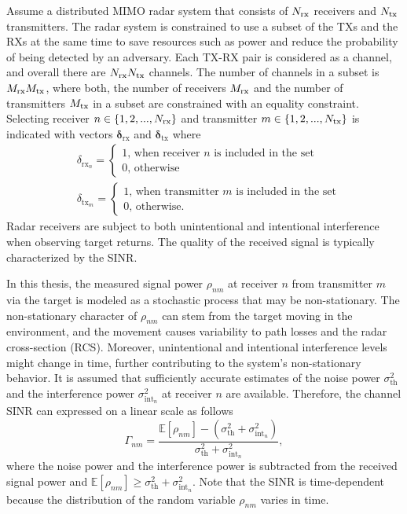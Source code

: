 \documentclass[english, 12pt, a4paper, elec, utf8, a-1b, online]{aaltothesis}
\numberwithin{equation}{section}
\newcommand{\E}[1]{\mathbb{E}\left[ #1 \right]}
\newcommand{\thnoise}{\sigma^2_{\text{th}}}
\newcommand{\eintnoise}{\sigma^2_{\text{int}_{n}}}
\newcommand{\esinrexp}{\Gamma_{nm}}
\newcommand{\easvtx}{\delta_{\text{tx}_m}}
\newcommand{\vasvtx}{\boldsymbol{\delta}_{\text{tx}}}
\newcommand{\easvrx}{\delta_{\text{rx}_n}}
\newcommand{\vasvrx}{\boldsymbol{\delta}_{\text{rx}}}
\newcommand{\esp}{\rho_{nm}}
\begin{document}
Assume a distributed MIMO radar system that consists of ${N_{\text{rx}}}$ receivers and ${N_{\text{tx}}}$ transmitters.
The radar system is constrained to use a subset of the TXs and the RXs at the same time to save resources such as power and reduce the probability of being detected by an adversary.
Each TX-RX pair is considered as a channel, and overall there are ${N_{\text{rx}}}{N_{\text{tx}}}$ channels.
The number of channels in a subset is ${M_{\text{rx}}} {M_{\text{tx}}}$, where both, the number of receivers ${M_{\text{rx}}}$ and the number of transmitters ${M_{\text{tx}}}$ in a subset are constrained with an equality constraint.
Selecting receiver $n \in \{1, 2, ..., {N_{\text{rx}}}\}$ and transmitter $m \in \{1,2, ..., {N_{\text{tx}}}\}$ is indicated with vectors $\vasvrx$ and $\vasvtx$ where
\begin{align}
    &\easvrx = 
    \left\{\begin{array}{l}
        1 \text{, when receiver $n$ is included in the set} \\
        0 \text{, otherwise}
    \end{array}\right.\\
    &\easvtx = 
    \left\{\begin{array}{l}
        1 \text{, when transmitter $m$ is included in the set} \\
        0 \text{, otherwise.}
    \end{array}\right.
\end{align}
Radar receivers are subject to both unintentional and intentional interference when observing target returns.
The quality of the received signal is typically characterized by the SINR.

In this thesis, the measured signal power $\esp$ at receiver $n$ from transmitter $m$ via the target is modeled as a stochastic process that may be non-stationary. 
The non-stationary character of $\esp$ can stem from the target moving in the environment, and 
the movement causes variability to path losses and the radar cross-section (RCS).
Moreover, unintentional and intentional interference levels might change in time, further contributing to the system's non-stationary behavior.
It is assumed that sufficiently accurate estimates of the noise power $\thnoise$ and the interference power $\eintnoise$ at receiver $n$ are available.
Therefore, the channel SINR can expressed on a linear scale as follows
\begin{equation}\label{eq:sinr}
     \esinrexp = \frac{\E{\esp} - (\thnoise + \eintnoise)}{\thnoise + \eintnoise },
\end{equation}
where the noise power and the interference power is subtracted from the received signal power and $\E{\esp} \geq \thnoise + \eintnoise$.
Note that the SINR is time-dependent because the distribution of the random variable $\esp$ varies in time. 
\end{document}
